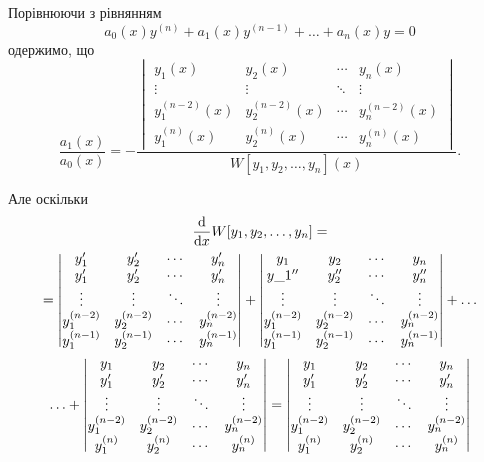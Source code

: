 Порівнюючи з рівнянням 
\begin{equation*}
	a_0(x) y^{(n)} + a_1(x) y^{(n - 1)} + \ldots + a_n(x) y = 0
\end{equation*}
одержимо, що
\begin{equation*}
	\frac{a_1(x)}{a_0(x)} = - \frac{\begin{vmatrix}
		y_1(x) & y_2(x) & \cdots & y_n(x) \\
		\vdots & \vdots & \ddots & \vdots \\
		y_1^{(n - 2)}(x) & y_2^{(n - 2)}(x) & \cdots & y_n^{(n - 2)}(x) \\
		y_1^{(n)}(x) & y_2^{(n)}(x) & \cdots & y_n^{(n)}(x)
	\end{vmatrix}}{W[y_1, y_2, \ldots, y_n](x)}.
\end{equation*}

Але оскільки
\begin{multline*}
	\frac{\mathop{}\!\mathrm{d}}{\mathop{}\!\mathrm{d} x} W[y_1, y_2, \ldots, y_n] = \\ = \begin{vmatrix}
		y_1' & y_2' & \cdots & y_n' \\
		y_1' & y_2' & \cdots & y_n' \\
		\vdots & \vdots & \ddots & \vdots \\
		y_1^{(n - 2)} & y_2^{(n - 2)} & \cdots & y_n^{(n - 2)} \\
		y_1^{(n - 1)} & y_2^{(n - 1)} & \cdots & y_n^{(n - 1)}
	\end{vmatrix} + \begin{vmatrix}
		y_1 & y_2 & \cdots & y_n \\
		y\_1'' & y_2'' & \cdots & y_n'' \\
		\vdots & \vdots & \ddots & \vdots \\
		y_1^{(n - 2)} & y_2^{(n - 2)} & \cdots & y_n^{(n - 2)} \\
		y_1^{(n - 1)} & y_2^{(n - 1)} & \cdots & y_n^{(n - 1)}
	\end{vmatrix} + \ldots \\ \ldots + \begin{vmatrix}
		y_1 & y_2 & \cdots & y_n \\
		y_1' & y_2' & \cdots & y_n' \\
		\vdots & \vdots & \ddots & \vdots \\
		y_1^{(n - 2)} & y_2^{(n - 2)} & \cdots & y_n^{(n - 2)} \\
		y_1^{(n)} & y_2^{(n)} & \cdots & y_n^{(n)}
	\end{vmatrix} = \begin{vmatrix}
		y_1 & y_2 & \cdots & y_n \\
		y_1' & y_2' & \cdots & y_n' \\
		\vdots & \vdots & \ddots & \vdots \\
		y_1^{(n - 2)} & y_2^{(n - 2)} & \cdots & y_n^{(n - 2)}\\
		y_1^{(n)} & y_2^{(n)} & \cdots & y_n^{(n)}
	\end{vmatrix}
\end{multline*}   
